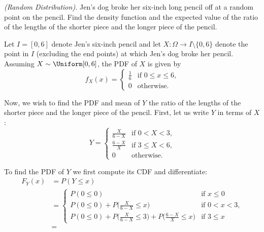 \begin{problem}[Handout 12, \# 19]
  \emph{(Random Distribution).} Jen's dog broke her six-inch long pencil
  off at a random point on the pencil. Find the density function and the
  expected value of the ratio of the lengths of the shorter piece and the
  longer piece of the pencil.
\end{problem}
\begin{solution}
  Let \(I=[0,6]\) denote Jen's six-inch pencil and let
  \(X\colon\Omega\to I\setminus\{0,6\}\) denote the point in \(I\)
  (excluding the end points) at which Jen's dog broke her pencil. Assuming
  \(X\sim\Uniform[0,6]\), the PDF of \(X\) is given by
  \[
    f_X(x)=
    \begin{cases}
      \frac{1}{6}&\text{if \(0\leq x\leq 6\),}\\
      0&\text{otherwise.}
    \end{cases}
  \]

  Now, we wish to find the PDF and mean of \(Y\) the ratio of the lengths
  of the shorter piece and the longer piece of the pencil. First, let us
  write \(Y\) in terms of \(X\):
  \[
    Y=
    \begin{cases}
      \frac{X}{6-X}&\text{if \(0<X<3\),}\\
      \frac{6-X}{X}&\text{if \(3\leq X<6\),}\\
      0&\text{otherwise.}
    \end{cases}
  \]

  To find the PDF of \(Y\) we first compute its CDF and differentiate:
  \begin{align*}
    F_Y(x)
    &=P(Y\leq x)\\
    &=\begin{cases}
      P(0\leq 0)&\text{if \(x\leq 0\)}\\
      P(0\leq 0)+P\bigl(\frac{X}{6-X}\leq x\bigr)&\text{if \(0<x<3\),}\\
      P(0\leq 0)+P\bigl(\frac{X}{6-X}\leq 3\bigr)+
      P\bigl(\frac{6-X}{X}\leq x\bigr)&\text{if \(3\leq x\)}
    \end{cases}\\
    &=
  \end{align*}
\end{solution}
\newpage

